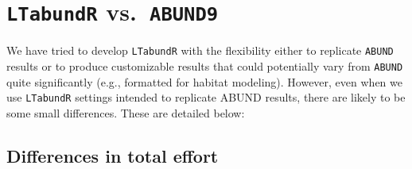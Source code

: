\documentclass[
]{book}
\begin{document}
\hypertarget{abund9_compare}{%
\chapter{\texorpdfstring{\texttt{LTabundR} vs.~\texttt{ABUND9}}{LTabundR vs.~ABUND9}}\label{abund9_compare}}

We have tried to develop \texttt{LTabundR} with the flexibility either to replicate \texttt{ABUND} results or to produce customizable results that could potentially vary from \texttt{ABUND} quite significantly (e.g., formatted for habitat modeling). However, even when we use \texttt{LTabundR} settings intended to replicate ABUND results, there are likely to be some small differences. These are detailed below:

\hypertarget{differences-in-total-effort}{%
\section*{Differences in total effort}\label{differences-in-total-effort}}
\end{document}
